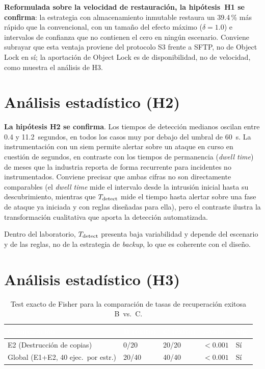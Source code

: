 \documentclass[../main.tex]{subfiles}
\begin{document}
\textbf{Reformulada sobre la velocidad de restauración, la hipótesis~H1 se confirma}:
la estrategia con almacenamiento inmutable restaura un 39.4\,\% más rápido que la
convencional, con un tamaño del efecto máximo ($\delta = 1.0$) e intervalos de
confianza que no contienen el cero en ningún escenario. Conviene subrayar que esta
ventaja proviene del protocolo S3 frente a SFTP, no de Object Lock en sí; la
aportación de Object Lock es de disponibilidad, no de velocidad, como muestra el
análisis de H3.

\section{Análisis estadístico (H2)}
\label{sec:estadistica-h2}

\textbf{La hipótesis H2 se confirma}. Los tiempos de detección medianos oscilan entre
0.4 y 11.2~segundos, en todos los casos muy por debajo del umbral de 60~s. La
instrumentación con un \gls{siem} permite alertar sobre un ataque en curso en
cuestión de segundos, en contraste con los tiempos de permanencia (\emph{dwell time})
de meses que la industria reporta de forma recurrente para incidentes no
instrumentados. Conviene precisar que ambas cifras no son directamente comparables (el \emph{dwell time} mide el intervalo desde la intrusión inicial hasta su
descubrimiento, mientras que $T_{\text{detect}}$ mide el tiempo hasta alertar sobre una fase
de ataque ya iniciada y con reglas diseñadas para ella), pero el contraste ilustra la
transformación cualitativa que aporta la detección automatizada.

Dentro del laboratorio, $T_{\text{detect}}$ presenta baja variabilidad y depende del escenario
y de las reglas, no de la estrategia de \emph{backup}, lo que es coherente con el
diseño.

\section{Análisis estadístico (H3)}
\label{sec:estadistica-h3}

\begin{table}[ht]
  \centering
  \begin{tabularx}{\textwidth}{X C{2cm} C{2cm} C{2.5cm} C{1.5cm}}
    \toprule
    \textcolor{white}{\textbf{Comparación}} &
    \textcolor{white}{\textbf{B (éxito)}} &
    \textcolor{white}{\textbf{C (éxito)}} &
    \textcolor{white}{\textbf{$p$-valor}} &
    \textcolor{white}{\textbf{Sig.}} \\
    \midrule
    E2 (Destrucción de copias)          & 0/20  & 20/20 & $< 0.001$ & Sí \\
    Global (E1+E2, 40 ejec.\ por estr.)   & 20/40 & 40/40 & $< 0.001$ & Sí \\
    \bottomrule
  \end{tabularx}
  \caption{Test exacto de Fisher para la comparación de tasas de recuperación
           exitosa B~vs.~C.}
  \label{tab:fisher}
\end{table}
\end{document}
